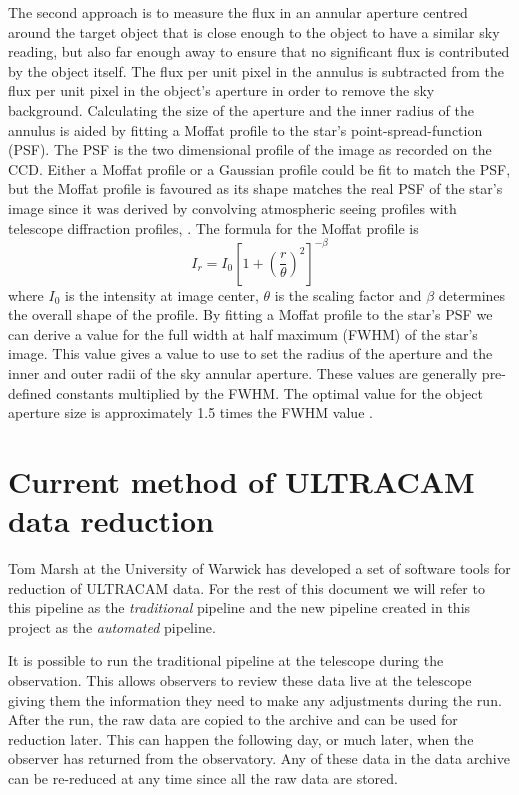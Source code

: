 The second approach is to measure the flux in an annular aperture centred around the target object that is close enough to the object to have a similar sky reading, but also far enough away to ensure that no significant flux is contributed by the object itself. The flux per unit pixel in the annulus is subtracted from the flux per unit pixel in the object's aperture in order to remove the sky background. Calculating the size of the aperture and the inner radius of the annulus is aided by fitting a Moffat profile to the star's point-spread-function (PSF). The PSF is the two dimensional profile of the image as recorded on the CCD.  Either a Moffat profile or a Gaussian profile could be fit to match the PSF, but the Moffat profile is favoured as its shape matches the real PSF of the star's image since it was derived by convolving atmospheric seeing profiles with telescope diffraction profiles, \citep{Moffat69}. The formula for the Moffat profile is \begin{equation} I_r = I_0 {[1 + {(\frac{r}{\theta})}^2]}^{-\beta}\end{equation} where $I_0$ is the intensity at image center, $\theta$ is the scaling factor and $\beta$ determines the overall shape of the profile. By fitting a Moffat profile to the star's PSF we can derive a value for the full width at half maximum (FWHM) of the star's image. This value gives a value to use to set the radius of the aperture and the inner and outer radii of the sky annular aperture. These values are generally pre-defined constants multiplied by the FWHM. The optimal value for the object aperture size is approximately 1.5 times the FWHM value \citep{optimalapertures}.

\section{Current method of ULTRACAM data reduction}
Tom Marsh at the University of Warwick has developed a set of software tools for reduction of ULTRACAM data. For the rest of this document we will refer to this pipeline as the \emph{traditional} pipeline and the new pipeline created in this project as the \emph{automated} pipeline. 

It is possible to run the traditional pipeline at the telescope during the observation. This allows observers to review these data live at the telescope giving them the information they need to make any adjustments during the run. After the run, the raw data are copied to the archive and can be used for reduction later. This can happen the following day, or much later, when the observer has returned from the observatory. Any of these data in the data archive can be re-reduced at any time since all the raw data are stored. 

